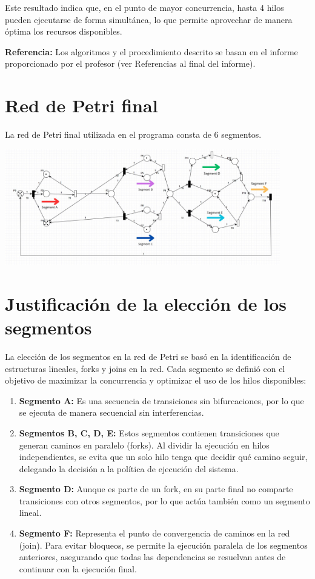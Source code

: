 \documentclass[12pt]{article}
\begin{document}
Este resultado indica que, en el punto de mayor concurrencia, hasta 4 hilos pueden ejecutarse de forma simultánea, lo que permite aprovechar de manera óptima los recursos disponibles.

\vspace{1em}
\textbf{Referencia:} Los algoritmos y el procedimiento descrito se basan en el informe proporcionado por el profesor (ver Referencias al final del informe).


\section{Red de Petri final}

La red de Petri final utilizada en el programa consta de 6 segmentos.
\begin{center}
    \includegraphics[width=0.9\textwidth]{Petri-Net-Final.jpeg}
\end{center}

\section{Justificación de la elección de los segmentos}

La elección de los segmentos en la red de Petri se basó en la identificación de estructuras lineales, forks y joins en la red. Cada segmento se definió con el objetivo de maximizar la concurrencia y optimizar el uso de los hilos disponibles:

\begin{enumerate}
    \item \textbf{Segmento A:} Es una secuencia de transiciones sin bifurcaciones, por lo que se ejecuta de manera secuencial sin interferencias.
    
    \item \textbf{Segmentos B, C, D, E:} Estos segmentos contienen transiciones que generan caminos en paralelo (forks). Al dividir la ejecución en hilos independientes, se evita que un solo hilo tenga que decidir qué camino seguir, delegando la decisión a la política de ejecución del sistema.
    
    \item \textbf{Segmento D:} Aunque es parte de un fork, en su parte final no comparte transiciones con otros segmentos, por lo que actúa también como un segmento lineal.
    
    \item \textbf{Segmento F:} Representa el punto de convergencia de caminos en la red (join). Para evitar bloqueos, se permite la ejecución paralela de los segmentos anteriores, asegurando que todas las dependencias se resuelvan antes de continuar con la ejecución final.
\end{enumerate}
\end{document}
